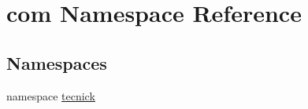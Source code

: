 \hypertarget{namespacecom}{\section{com Namespace Reference}
\label{namespacecom}
}
\subsection*{Namespaces}
\begin{DoxyCompactItemize}
\item 
namespace \hyperlink{namespacecom_1_1tecnick}{tecnick}
\end{DoxyCompactItemize}
